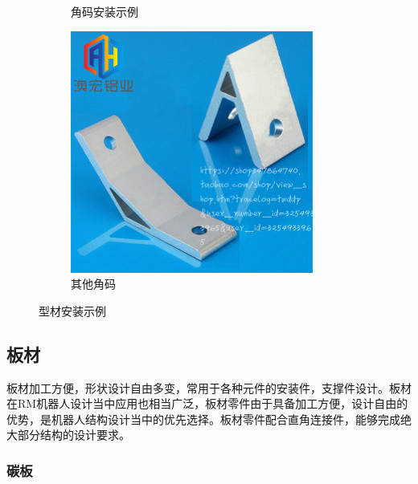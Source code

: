 \documentclass[UTF8]{article} %
\begin{document}
\begin{itemize}
\begin{figure}[H]
\begin{subfigure}[b]{0.3\textwidth}
            \caption{角码安装示例}
    \end{subfigure}
    \begin{subfigure}[b]{0.3\textwidth}
      \centering
      \includegraphics[width=\textwidth]{chaun3.png}
      \caption{其他角码}
    \end{subfigure}
    \caption{型材安装示例}
  \end{figure}
  \label{xing}
\end{itemize}

\subsection{板材}
板材加工方便，形状设计自由多变，常用于各种元件的安装件，支撑件设计。板材在RM机器人设计当中应用也相当广泛，板材零件由于具备加工方便，设计自由的优势，是机器人结构设计当中的优先选择。板材零件配合直角连接件，能够完成绝大部分结构的设计要求。

\subsubsection{碳板}
\end{document}
